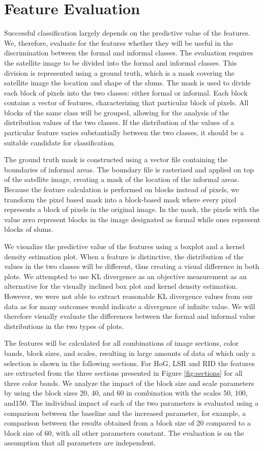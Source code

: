 
\section{Feature Evaluation}

Successful classification largely depends on the predictive value of the features. We, therefore, evaluate for the features whether they will be useful in the discrimination between the formal and informal classes. The evaluation requires the satellite image to be divided into the formal and informal classes. This division is represented using a ground truth, which is a mask covering the satellite image the location and shape of the slums. The mask is used to divide each block of pixels into the two classes: either formal or informal. Each block contains a vector of features, characterizing that particular block of pixels. All blocks of the same class will be grouped, allowing for the analysis of the distribution values of the two classes. If the distribution of the values of a particular feature varies substantially between the two classes, it should be a suitable candidate for classification.

The ground truth mask is constructed using a vector file containing the boundaries of informal areas. The boundary file is rasterized and applied on top of the satellite image, creating a mask of the location of the informal areas. Because the feature calculation is performed on blocks instead of pixels, we transform the pixel based mask into a block-based mask where every pixel represents a block of pixels in the original image. In the mask, the pixels with the value zero represent blocks in the image designated as formal while ones represent blocks of slums.

We visualize the predictive value of the features using a boxplot and a kernel density estimation plot. When a feature is distinctive, the distribution of the values in the two classes will be different, thus creating a visual difference in both plots. We attempted to use KL divergence as an objective measurement as an alternative for the visually inclined box plot and kernel density estimation. However, we were not able to extract reasonable KL divergence values from our data as for many outcomes would indicate a divergence of infinite value. We will therefore visually evaluate the differences between the formal and informal value distributions in the two types of plots.

The features will be calculated for all combinations of image sections, color bands, block sizes, and scales, resulting in large amounts of data of which only a selection is shown in the following sections. For HoG, LSR and RID the features are extracted from the three sections presented in Figure
\ref{fig:sections} for all three color bands. We analyze the impact of the block size and scale parameters by using the block sizes 20, 40, and 60 in combination with the scales 50, 100, and150. The individual
impact of each of the two parameters is evaluated using a comparison between the baseline and the increased parameter, for example, a comparison between the results obtained from a block size of 20 compared to a block size of 60, with all other parameters constant. The evaluation is on the assumption that all parameters are independent.

